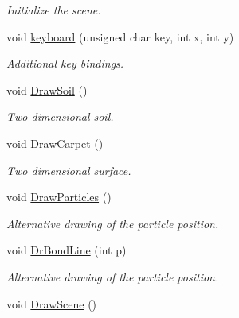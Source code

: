\begin{DoxyCompactItemize}
\begin{DoxyCompactList}\small\item\em Initialize the scene. \end{DoxyCompactList}\item 
void \hyperlink{classForces_aef7ba2f69afb2d954545f64c7fe24b14}{keyboard} (unsigned char key, int x, int y)\hypertarget{classForces_aef7ba2f69afb2d954545f64c7fe24b14}{}\label{classForces_aef7ba2f69afb2d954545f64c7fe24b14}

\begin{DoxyCompactList}\small\item\em Additional key bindings. \end{DoxyCompactList}\item 
void \hyperlink{classForces_a67bc3c9dc5545a69fc67ac97ad8073d7}{Draw\+Soil} ()\hypertarget{classForces_a67bc3c9dc5545a69fc67ac97ad8073d7}{}\label{classForces_a67bc3c9dc5545a69fc67ac97ad8073d7}

\begin{DoxyCompactList}\small\item\em Two dimensional soil. \end{DoxyCompactList}\item 
void \hyperlink{classForces_a513ff446a4f7dcabe0879c5225686bb5}{Draw\+Carpet} ()\hypertarget{classForces_a513ff446a4f7dcabe0879c5225686bb5}{}\label{classForces_a513ff446a4f7dcabe0879c5225686bb5}

\begin{DoxyCompactList}\small\item\em Two dimensional surface. \end{DoxyCompactList}\item 
void \hyperlink{classForces_a2e34d3fde75270ca8e234e988acacaeb}{Draw\+Particles} ()\hypertarget{classForces_a2e34d3fde75270ca8e234e988acacaeb}{}\label{classForces_a2e34d3fde75270ca8e234e988acacaeb}

\begin{DoxyCompactList}\small\item\em Alternative drawing of the particle position. \end{DoxyCompactList}\item 
void \hyperlink{classForces_aaafad604e85636fc1404b8973e3a6361}{Dr\+Bond\+Line} (int p)\hypertarget{classForces_aaafad604e85636fc1404b8973e3a6361}{}\label{classForces_aaafad604e85636fc1404b8973e3a6361}

\begin{DoxyCompactList}\small\item\em Alternative drawing of the particle position. \end{DoxyCompactList}\item 
void \hyperlink{classForces_ad3af99165d3fa882579d67cea83e9eab}{Draw\+Scene} ()\hypertarget{classForces_ad3af99165d3fa882579d67cea83e9eab}{}\label{classForces_ad3af99165d3fa882579d67cea83e9eab}


\end{DoxyCompactItemize}
